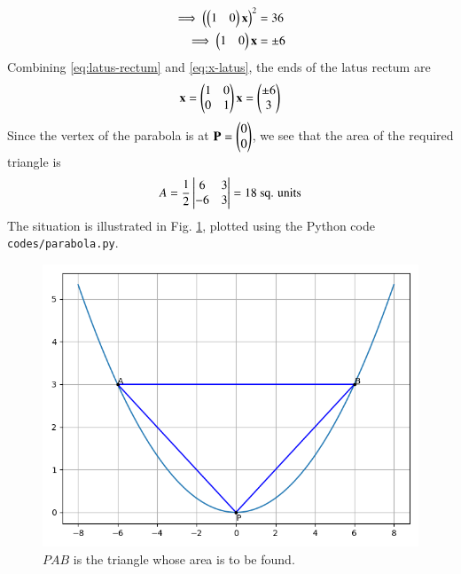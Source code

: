 \documentclass[journal,12pt,twocolumn]{IEEEtran}
\renewcommand{\vec}[1]{\boldsymbol{\mathbf{#1}}}
\begin{document}
\begin{enumerate}
\begin{align}
        \implies \brak{\myvec{1&0}\vec{x}}^2 &= 36 \\
        \implies \myvec{1&0}\vec{x} &= \pm 6
        \label{eq:x-latus}
    \end{align}
    Combining \eqref{eq:latus-rectum} and \eqref{eq:x-latus}, the ends of the 
    latus rectum are
    \begin{align}
        \vec{x} = \myvec{1&0\\0&1}\vec{x} = \myvec{\pm 6\\3}
    \end{align}
    Since the vertex of the parabola is at $\vec{P} = \myvec{0\\0}$,
    we see that the area of the required triangle is
    \begin{align}
        A = \frac{1}{2}\begin{vmatrix}6&3\\-6&3\end{vmatrix} = 18\ \textrm{sq. units}
    \end{align}
    The situation is illustrated in Fig. \ref{fig:parabola}, plotted using the
    Python code \texttt{codes/parabola.py}.
    \begin{figure}[!ht]
        \centering
        \includegraphics[width=\columnwidth]{figs/parabola.png}
        \caption{$PAB$ is the triangle whose area is to be found.}
        \label{fig:parabola}
    \end{figure}
\end{enumerate}
\end{document}
